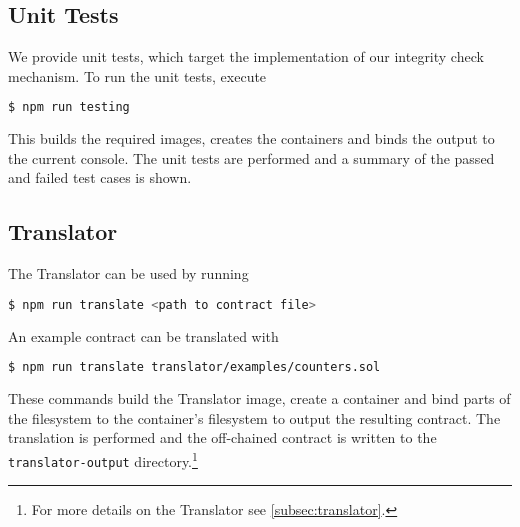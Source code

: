 		\subsection*{Unit Tests}
		\label{subsec:deployment-tests}

			We provide unit tests, which target the implementation of our integrity check mechanism.
			To run the unit tests, execute
			\begin{lstlisting}[language=bash]
$ npm run testing
			\end{lstlisting}
			This builds the required images, creates the containers and binds the output to the current console.
			The unit tests are performed and a summary of the passed and failed test cases is shown.
	
		\subsection*{Translator}
		\label{subsec:deployment-translator}

			The Translator can be used by running
			\begin{lstlisting}[language=bash]
$ npm run translate <path to contract file>
			\end{lstlisting}
			An example contract can be translated with
			\begin{lstlisting}[language=bash]
$ npm run translate translator/examples/counters.sol
			\end{lstlisting}
			These commands build the Translator image, create a container and bind parts of the filesystem to the container's filesystem to output the resulting contract.
			The translation is performed and the off-chained contract is written to the \texttt{translator-output} directory.\footnote{For more details on the Translator see \autoref{subsec:translator}.}

